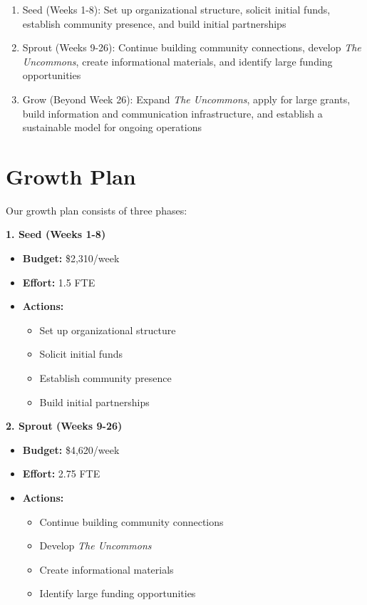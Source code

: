 \documentclass[
  letterpaper,
  DIV=11,
  numbers=noendperiod]{scrreprt}
\providecommand{\tightlist}{%
  \setlength{\itemsep}{0pt}\setlength{\parskip}{0pt}}\usepackage{longtable,booktabs,array}
\begin{document}
\begin{enumerate}
\def\labelenumi{\arabic{enumi}.}
\tightlist
\item
  Seed (Weeks 1-8): Set up organizational structure, solicit initial
  funds, establish community presence, and build initial partnerships
\item
  Sprout (Weeks 9-26): Continue building community connections, develop
  \emph{The Uncommons}, create informational materials, and identify
  large funding opportunities
\item
  Grow (Beyond Week 26): Expand \emph{The Uncommons}, apply for large
  grants, build information and communication infrastructure, and
  establish a sustainable model for ongoing operations
\end{enumerate}

\section{Growth Plan}\label{sec-aagu_growth_plan}

Our growth plan consists of three phases:

\textbf{1. Seed (Weeks 1-8)}

\begin{itemize}
\tightlist
\item
  \textbf{Budget:} \$2,310/week
\item
  \textbf{Effort:} 1.5 FTE
\item
  \textbf{Actions:}

  \begin{itemize}
  \tightlist
  \item
    Set up organizational structure
  \item
    Solicit initial funds
  \item
    Establish community presence
  \item
    Build initial partnerships
  \end{itemize}
\end{itemize}

\textbf{2. Sprout (Weeks 9-26)}

\begin{itemize}
\tightlist
\item
  \textbf{Budget:} \$4,620/week
\item
  \textbf{Effort:} 2.75 FTE
\item
  \textbf{Actions:}

  \begin{itemize}
  \tightlist
  \item
    Continue building community connections
  \item
    Develop \emph{The Uncommons}
  \item
    Create informational materials
  \item
    Identify large funding opportunities
  \end{itemize}
\end{itemize}
\end{document}
